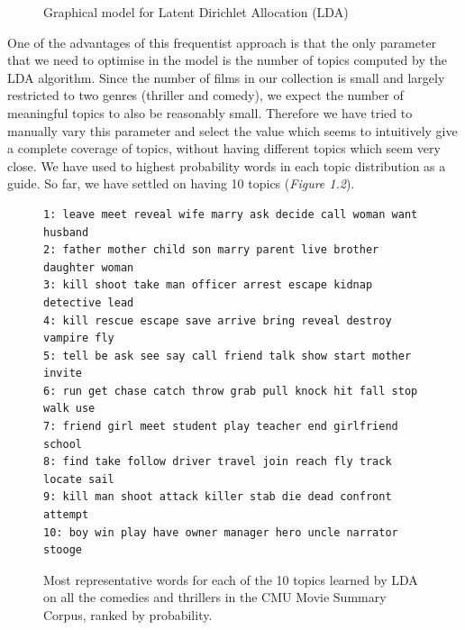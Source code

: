 \documentclass[bsc,frontabs,singlespacing,parskip, twoside]{infthesis}
\begin{document}
\begin{figure}[h!]
\centering
{}
\caption{Graphical model for Latent Dirichlet Allocation (LDA)}
\label{fig:lda}
\end{figure}

One of the advantages of this frequentist approach is that the only parameter that we need to optimise in the model is the number of topics computed by the LDA algorithm. Since the number of films in our collection is small and largely restricted to two genres (thriller and comedy), we expect the number of meaningful topics to also be reasonably small. Therefore we have tried to manually vary this parameter and select the value which seems to intuitively give a complete coverage of topics, without having different topics which seem very close. We have used to highest probability words in each topic distribution as a guide. So far, we have settled on having 10 topics (\textit{Figure 1.2}).

\begin{figure}[h]
\begin{minipage}{14.6cm}
\begin{Verbatim}[frame=single]
1: leave meet reveal wife marry ask decide call woman want husband
2: father mother child son marry parent live brother daughter woman
3: kill shoot take man officer arrest escape kidnap detective lead
4: kill rescue escape save arrive bring reveal destroy vampire fly
5: tell be ask see say call friend talk show start mother invite
6: run get chase catch throw grab pull knock hit fall stop walk use
7: friend girl meet student play teacher end girlfriend school 
8: find take follow driver travel join reach fly track locate sail
9: kill man shoot attack killer stab die dead confront attempt
10: boy win play have owner manager hero uncle narrator stooge
\end{Verbatim}
\end{minipage}
\caption{Most representative words for each of the 10 topics learned by LDA on all the comedies and thrillers in the CMU Movie Summary Corpus, ranked by probability.}
\label{topics}
\end{figure}
\end{document}
